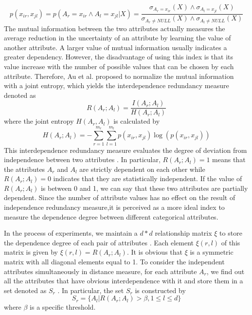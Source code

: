 \documentclass[review]{elsarticle}
\begin{document}
\begin{equation}
p(x_{ir},x_{jl}) = p(A_r = x_{ir} \wedge A_l = x_{jl}|X) = \frac{\sigma_{A_r = x_{ir}}(X) \wedge \sigma_{A_l = x_{jl}}(X)}{\sigma_{A_r \neq NULL}(X) \wedge \sigma_{A_l \neq NULL}(X)}
\label{equ13}
\end{equation}
The mutual information between the two attributes actually measures the average reduction in the uncertainty of an attribute by learning the value of another attribute. A larger value of mutual information usually indicates a greater dependency. However, the disadvantage of using this index is that its value increase with the number of possible values that can be chosen by each attribute. Therefore, Au et al. \cite{WaiHoAu2005Grouping} proposed to normalize the mutual information with a joint entropy, which yields the interdependence redundancy measure denoted as
\begin{equation}
R(A_r;A_l) = \frac{I(A_r;A_l)}{H(A_r;A_l)}
\label{equ14}
\end{equation}
where the joint entropy $H(A_r,A_l)$ is calculated by
\begin{equation}
H(A_r;A_l) = - \sum_{r=1}^{m_r}\sum_{l=1}^{m_l}p(x_{ir},x_{jl})\log(p(x_{ir},x_{jl}))
\label{equ15}
\end{equation}
This interdependence redundancy measure evaluates the degree of deviation from independence between two attributes \cite{WaiHoAu2005Grouping}. In particular, $R(A_r;A_l) = 1$ means that the attributes $A_r$ and $A_l$ are strictly dependent on each other while $R(A_r;A_l) = 0$ indicates that they are statistically independent. If the value of $R(A_r;A_l)$ is between 0 and 1, we can say that these two attributes are partially dependent. Since the number of attribute values has no effect on the result of independence redundancy measure,it is perceived as a more ideal index to measure the dependence degree between different categorical attributes.

In the process of experiments, we maintain a $d*d$ relationship matrix $\xi$ to store the dependence degree of each pair of attributes \cite{JiaH2016NewMetric}. Each element $\xi(r,l)$ of this matrix is given by $\xi(r,l) = R(A_r;A_l)$. It is obvious that $\xi$ is a symmetric matrix with all diagonal elements equal to 1. To consider the independent attributes simultaneously in distance measure, for each attribute $A_r$, we find out all the attributes that have obvious interdependence with it and store them in a set denoted as $S_r$ \cite{JiaH2016NewMetric}. In particular, the set $S_r$ is constructed by
\begin{equation}
S_r = \{A_l|R(A_r;A_l) > \beta, 1 \leq l \leq d \}
\label{equ16}
\end{equation}
where $\beta$ is a specific threshold.
\end{document}
